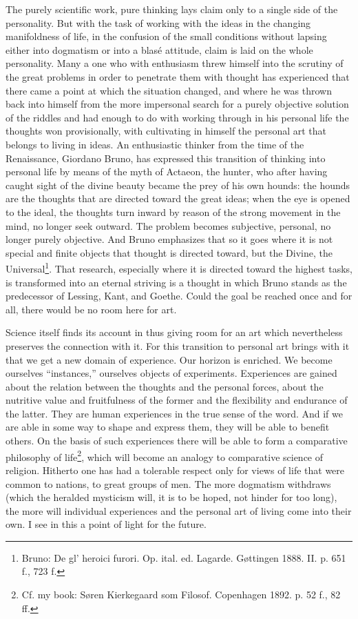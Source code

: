 \documentclass[12pt,a4paper,openany]{book}
\newcommand{\opage}[1]{\marginnote{\footnotesize\textit{[#1]}}}
\begin{document}
The purely scientific work, pure thinking lays claim
only to a single side of the personality. But with
the task of working with the ideas in the changing
manifoldness of life, in the confusion of the small conditions without lapsing
either into dogmatism or into a blasé attitude, claim is laid
on the whole personality. Many a one who with enthusiasm
\opage{187}threw himself into the scrutiny of the great problems in order to
penetrate them with thought has experienced that there came a
point at which the situation changed, and where he was thrown back
into himself from the more impersonal search for a purely objective solution of
the riddles and had enough to do with
working through in his personal life the thoughts won provisionally,
with cultivating in himself the personal art that belongs
to living in ideas. An enthusiastic thinker from
the time of the Renaissance, Giordano Bruno, has expressed this transition of
thinking into personal life by means of the myth of Actaeon,
the hunter, who after having caught sight of the
divine beauty became the prey of his own hounds: the hounds
are the thoughts that are directed toward the great ideas; when the eye is
opened to the ideal, the thoughts turn inward by reason of the
strong movement in the mind, no longer seek outward.
The problem becomes subjective, personal, no longer purely
objective. And Bruno emphasizes that so it goes where
it is not special and finite objects that thought is directed
toward, but the Divine, the Universal\footnote{Bruno: De gl’ heroici furori. Op. ital. ed. Lagarde. Gøttingen
1888. II. p. 651 f., 723 f.}. That research,
especially where it is directed toward the highest tasks, is transformed into
an eternal striving is a thought in which Bruno stands as
the predecessor of Lessing, Kant, and Goethe. Could the goal be reached
once and for all, there would be no room here for art.

Science itself finds its account in thus
giving room for an art which nevertheless preserves the connection
with it. For this transition to personal art brings with it
that we get a new domain of experience. Our horizon is enriched.
We become ourselves ``instances,'' ourselves objects of experiments.
Experiences are gained about the relation between the thoughts and the
personal forces, about the nutritive value and fruitfulness of the former
and the flexibility and endurance of the latter. They are human
experiences in the true sense of the word. And if we are able in some
way to shape and express them, they will be able to
benefit others. On the basis of
such experiences there will be able to form a comparative philosophy of
\opage{188}life\footnote{Cf. my book: Søren Kierkegaard som Filosof. Copenhagen 1892. p.
52 f., 82 ff.}, which will become an analogy to comparative
science of religion. Hitherto one has had a tolerable
respect only for views of life that were common to nations, to
great groups of men. The more dogmatism withdraws
(which the heralded mysticism will, it is to be hoped, not
hinder for too long), the more will individual experiences and
the personal art of living come into their own. I see in this
a point of light for the future.
\end{document}
